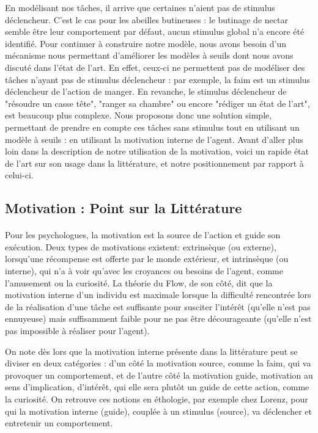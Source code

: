 En modélisant nos tâches, il arrive que certaines n'aient pas de stimulus déclencheur. C'est le cas pour les abeilles butineuses : le butinage de nectar semble être leur comportement par défaut, aucun stimulus global n'a encore été identifié. Pour continuer à construire notre modèle, nous avons besoin d'un mécanisme nous permettant d'améliorer les modèles à seuils dont nous avons discuté dans l'état de l'art. En effet, ceux-ci ne permettent pas de modéliser des tâches n'ayant pas de stimulus déclencheur : par exemple, la faim est un stimulus déclencheur de l'action de manger. En revanche, le stimulus déclencheur de "résoudre un casse tête", "ranger sa chambre" ou encore "rédiger un état de l'art", est beaucoup plus complexe. Nous proposons donc une solution simple, permettant de prendre en compte ces tâches sans stimulus tout en utilisant un modèle à seuils : en utilisant la motivation interne de l'agent. Avant d'aller plus loin dans la description de notre utilisation de la motivation, voici un rapide état de l'art sur son usage dans la littérature, et notre positionnement par rapport à celui-ci.
	
	\subsection{Motivation : Point sur la Littérature}

\paragraph{}
Pour les psychologues, la motivation est la source de l'action et guide son exécution. Deux types de motivations existent: extrinsèque (ou externe), lorsqu'une récompense est offerte par le monde extérieur, et intrinsèque (ou interne), qui n'a à voir qu'avec les croyances ou besoins de l'agent, comme l'amusement ou la curiosité. La théorie du Flow\cite{csikszentmihalyi_finding_1997}, de son côté, dit que la motivation interne d'un individu est maximale lorsque la difficulté rencontrée lors de la réalisation d'une tâche est suffisante pour susciter l'intérêt (qu'elle n'est pas ennuyeuse) mais suffisamment faible pour ne pas être décourageante (qu'elle n'est pas impossible à réaliser pour l'agent). 

On note dès lors que la motivation interne présente dans la littérature peut se diviser en deux catégories : d'un côté la motivation source, comme la faim, qui va provoquer un comportement, et de l'autre côté la motivation guide, motivation au sens d'implication, d'intérêt, qui elle sera plutôt un guide de cette action, comme la curiosité. On retrouve ces notions en éthologie, par exemple chez Lorenz\cite{lorenz_les_1984}, pour qui la motivation interne (guide), couplée à un stimulus (source), va déclencher et entretenir un comportement.
        
